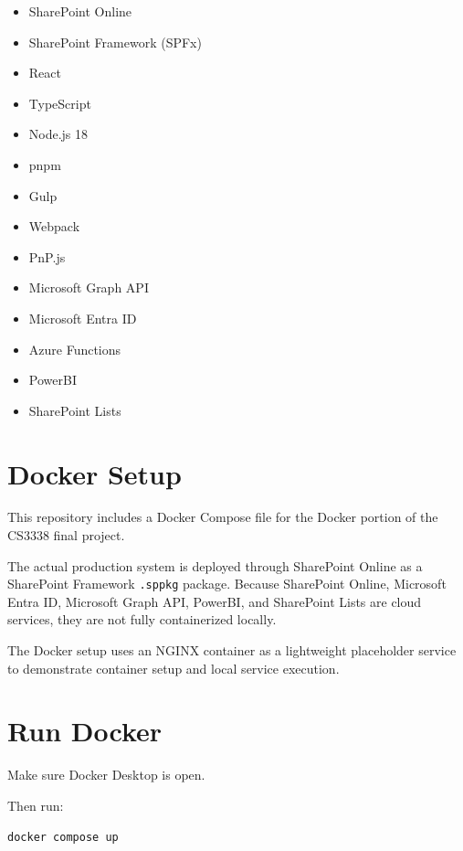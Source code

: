 \documentclass{article}
\begin{document}
\begin{itemize}
    \item SharePoint Online
    \item SharePoint Framework (SPFx)
    \item React
    \item TypeScript
    \item Node.js 18
    \item pnpm
    \item Gulp
    \item Webpack
    \item PnP.js
    \item Microsoft Graph API
    \item Microsoft Entra ID
    \item Azure Functions
    \item PowerBI
    \item SharePoint Lists
\end{itemize}

\section*{Docker Setup}

This repository includes a Docker Compose file for the Docker portion of the CS3338 final project.

The actual production system is deployed through SharePoint Online as a SharePoint Framework \texttt{.sppkg} package. Because SharePoint Online, Microsoft Entra ID, Microsoft Graph API, PowerBI, and SharePoint Lists are cloud services, they are not fully containerized locally.

The Docker setup uses an NGINX container as a lightweight placeholder service to demonstrate container setup and local service execution.

\section*{Run Docker}

Make sure Docker Desktop is open.

Then run:

\begin{lstlisting}[language=bash]
docker compose up
\end{lstlisting}
\end{document}
